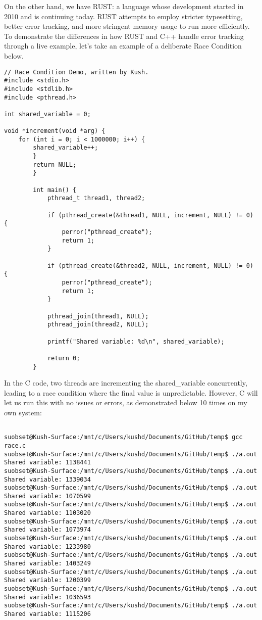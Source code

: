 \documentclass[conference]{IEEEtran}
\begin{document}
On the other hand, we have RUST: a language whose development started in 2010 and is continuing today. RUST attempts to employ stricter typesetting, better error tracking, and more stringent memory usage to run more efficiently. To demonstrate the differences in how RUST and C++ handle error tracking through a live example, let's take an example of a deliberate Race Condition below. 

\begin{lstlisting}
// Race Condition Demo, written by Kush.
#include <stdio.h>
#include <stdlib.h>
#include <pthread.h>

int shared_variable = 0;

void *increment(void *arg) {
    for (int i = 0; i < 1000000; i++) {
        shared_variable++;
        }
        return NULL;
        }

        int main() {
            pthread_t thread1, thread2;

            if (pthread_create(&thread1, NULL, increment, NULL) != 0) {
                perror("pthread_create");
                return 1;
            }

            if (pthread_create(&thread2, NULL, increment, NULL) != 0) {
                perror("pthread_create");
                return 1;
            }

            pthread_join(thread1, NULL);
            pthread_join(thread2, NULL);

            printf("Shared variable: %d\n", shared_variable);

            return 0;
        }
\end{lstlisting}

In the C code, two threads are incrementing the shared_variable concurrently, leading to a race condition where the final value is unpredictable. However, C will let us run this with no issues or errors, as demonstrated below 10 times on my own system:

\begin{lstlisting}

suobset@Kush-Surface:/mnt/c/Users/kushd/Documents/GitHub/temp$ gcc race.c
suobset@Kush-Surface:/mnt/c/Users/kushd/Documents/GitHub/temp$ ./a.out
Shared variable: 1138441
suobset@Kush-Surface:/mnt/c/Users/kushd/Documents/GitHub/temp$ ./a.out
Shared variable: 1339034
suobset@Kush-Surface:/mnt/c/Users/kushd/Documents/GitHub/temp$ ./a.out
Shared variable: 1070599
suobset@Kush-Surface:/mnt/c/Users/kushd/Documents/GitHub/temp$ ./a.out
Shared variable: 1103020
suobset@Kush-Surface:/mnt/c/Users/kushd/Documents/GitHub/temp$ ./a.out
Shared variable: 1073974
suobset@Kush-Surface:/mnt/c/Users/kushd/Documents/GitHub/temp$ ./a.out
Shared variable: 1233980
suobset@Kush-Surface:/mnt/c/Users/kushd/Documents/GitHub/temp$ ./a.out
Shared variable: 1403249
suobset@Kush-Surface:/mnt/c/Users/kushd/Documents/GitHub/temp$ ./a.out
Shared variable: 1200399
suobset@Kush-Surface:/mnt/c/Users/kushd/Documents/GitHub/temp$ ./a.out
Shared variable: 1036593
suobset@Kush-Surface:/mnt/c/Users/kushd/Documents/GitHub/temp$ ./a.out
Shared variable: 1115206

\end{lstlisting}
\end{document}
